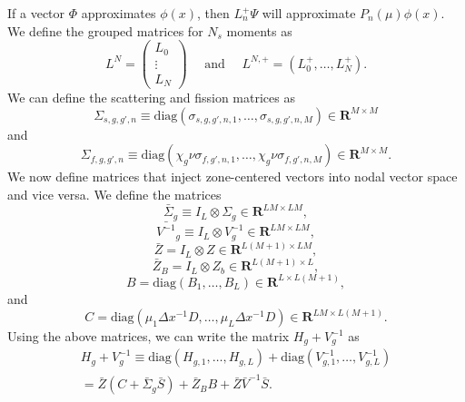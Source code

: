 If a vector $\Phi$ approximates $\phi(x)$, then $L_{n}^{+}\Psi$ will approximate $P_{n}(\mu)\phi(x)$. We define the grouped matrices for $N_{s}$ moments as
\begin{equation*}
L^{N} = \begin{pmatrix}
		L_{0} \\
		\vdots \\
		L_{N}
	     \end{pmatrix} \quad \text{ and } \quad
L^{N,+} = (L_{0}^{+}, \dots, L_{N}^{+}).
\end{equation*}
We can define the scattering and fission matrices as
\begin{equation*}
	\Sigma_{s,g,g',n} \equiv \text{diag}(\sigma_{s,g,g',n,1}, \dots, \sigma_{s,g,g',n,M}) \in \mathbf{R}^{M \times M}
\end{equation*}
and
\begin{equation*}
	\Sigma_{f,g,g',n} \equiv \text{diag}(\chi_{g}\nu\sigma_{f,g',n,1}, \dots, \chi_{g}\nu\sigma_{f,g',n,M}) \in \mathbf{R}^{M \times M}.
\end{equation*}
We now define matrices that inject zone-centered vectors into nodal vector space and vice versa. We define the matrices
\begin{equation*}
\bar{\Sigma}_{g} \equiv I_{L} \otimes \Sigma_{g} \in \mathbf{R}^{LM \times LM},
\end{equation*}
\begin{equation*}
\bar{V^{-1}}_{g} \equiv I_{L} \otimes V^{-1}_{g} \in \mathbf{R}^{LM \times LM},
\end{equation*}
\begin{equation*}
	\bar{Z} = I_{L} \otimes Z \in \mathbf{R}^{L(M+1) \times LM},
\end{equation*}
\begin{equation*}
	\bar{Z}_{B} = I_{L} \otimes Z_{b} \in \mathbf{R}^{L(M+1) \times L},
\end{equation*}
\begin{equation*}
	B = \text{diag}(B_{1}, \dots, B_{L}) \in \mathbf{R}^{L \times L(M+1)},
\end{equation*}
and
\begin{equation*}
	C = \text{diag}(\mu_{1}\Delta x^{-1}D, \dots, \mu_{L} \Delta x^{-1}D) \in \mathbf{R}^{LM \times L(M+1)}.
\end{equation*}
Using the above matrices, we can write the matrix $H_{g} + V^{-1}_{g}$ as
\begin{multline*}
H_{g} + V^{-1}_{g} \equiv \text{diag}(H_{g,1}, \dots, H_{g,L}) + \text{diag}(V^{-1}_{g,1}, \dots, V^{-1}_{g,L}) \\ = \bar{Z}(C + \bar{\Sigma}_{g}\bar{S}) + \bar{Z}_{B}B + \bar{Z}\bar{V}^{-1}\bar{S}.
\end{multline*}
